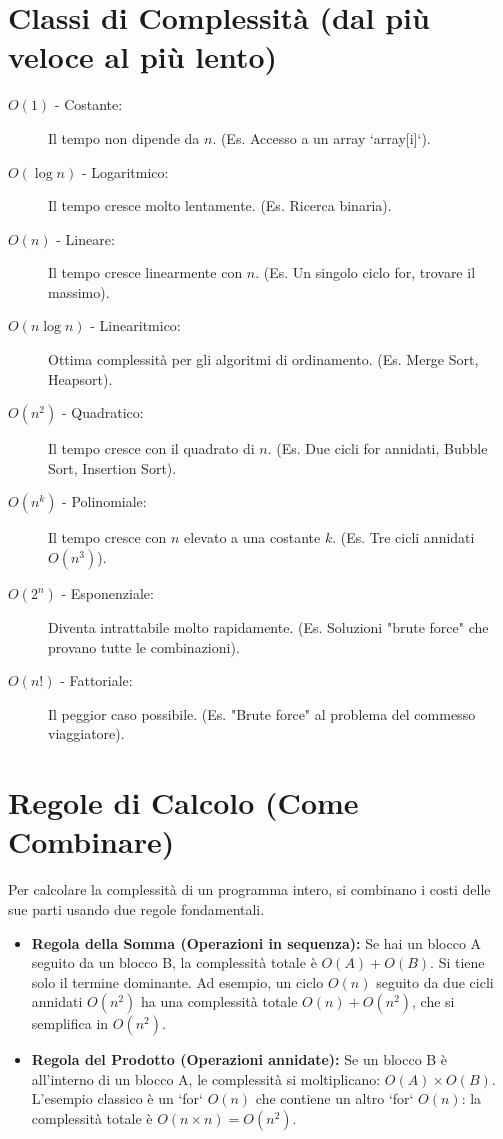 \section{Classi di Complessità (dal più veloce al più lento)}
\begin{example}
\begin{description}
    \item[$O(1)$ - Costante:] Il tempo non dipende da $n$. (Es. Accesso a un array `array[i]`).
    \item[$O(\log n)$ - Logaritmico:] Il tempo cresce molto lentamente. (Es. Ricerca binaria).
    \item[$O(n)$ - Lineare:] Il tempo cresce linearmente con $n$. (Es. Un singolo ciclo for, trovare il massimo).
    \item[$O(n \log n)$ - Linearitmico:] Ottima complessità per gli algoritmi di ordinamento. (Es. Merge Sort, Heapsort).
    \item[$O(n^2)$ - Quadratico:] Il tempo cresce con il quadrato di $n$. (Es. Due cicli for annidati, Bubble Sort, Insertion Sort).
    \item[$O(n^k)$ - Polinomiale:] Il tempo cresce con $n$ elevato a una costante $k$. (Es. Tre cicli annidati $O(n^3)$).
    \item[$O(2^n)$ - Esponenziale:] Diventa intrattabile molto rapidamente. (Es. Soluzioni "brute force" che provano tutte le combinazioni).
    \item[$O(n!)$ - Fattoriale:] Il peggior caso possibile. (Es. "Brute force" al problema del commesso viaggiatore).
\end{description}
\end{example}

\section{Regole di Calcolo (Come Combinare)}
Per calcolare la complessità di un programma intero, si combinano i costi delle sue parti usando due regole fondamentali.

\begin{observation}
\begin{itemize}
    \item \textbf{Regola della Somma (Operazioni in sequenza):} Se hai un blocco A seguito da un blocco B, la complessità totale è $O(A) + O(B)$. Si tiene solo il termine dominante.
    Ad esempio, un ciclo $O(n)$ seguito da due cicli annidati $O(n^2)$ ha una complessità totale $O(n) + O(n^2)$, che si semplifica in $O(n^2)$.
    
    \item \textbf{Regola del Prodotto (Operazioni annidate):} Se un blocco B è all'interno di un blocco A, le complessità si moltiplicano: $O(A) \times O(B)$.
    L'esempio classico è un `for` $O(n)$ che contiene un altro `for` $O(n)$: la complessità totale è $O(n \times n) = O(n^2)$.
\end{itemize}
\end{observation}

